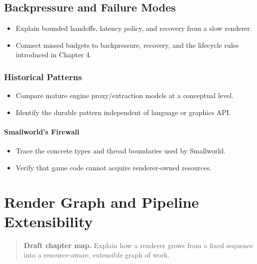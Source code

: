\documentclass[
  11pt,
  letterpaper,
  DIV=11,
  numbers=noendperiod,
  twoside,
  open=right]{scrreprt}
\providecommand{\tightlist}{%
  \setlength{\itemsep}{0pt}\setlength{\parskip}{0pt}}
\begin{document}
\section{Backpressure and Failure
Modes}\label{backpressure-and-failure-modes}

\begin{itemize}
\tightlist
\item
  Explain bounded handoffs, latency policy, and recovery from a slow
  renderer.
\item
  Connect missed budgets to backpressure, recovery, and the lifecycle
  rules introduced in Chapter 4.
\end{itemize}

\subsection{Historical Patterns}\label{historical-patterns}

\begin{itemize}
\tightlist
\item
  Compare mature engine proxy/extraction models at a conceptual level.
\item
  Identify the durable pattern independent of language or graphics API.
\end{itemize}

\subsubsection{Smallworld's Firewall}\label{smallworlds-firewall}

\begin{itemize}
\tightlist
\item
  Trace the concrete types and thread boundaries used by Smallworld.
\item
  Verify that game code cannot acquire renderer-owned resources.
\end{itemize}

\chapter{Render Graph and Pipeline
Extensibility}\label{render-graph-and-pipeline-extensibility}

\begin{quote}
\textbf{Draft chapter map.} Explain how a renderer grows from a fixed
sequence into a resource-aware, extensible graph of work.
\end{quote}
\end{document}
